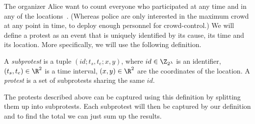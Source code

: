 
The organizer Alice want to count everyone who participated at any time and in 
any of the locations~\cite{2016DemonstrationsInSeoul}.
(Whereas police are only interested in the maximum crowd at any point in time, 
to deploy enough personnel for crowd-control.)
We will define a protest as an event that is uniquely identified by its cause, 
its time and its location.
More specifically, we will use the following definition.

\begin{definition}[Protest]\label{DefProtest}
  A \emph{subprotest} is a tuple \((id; t_s, t_e; x, y)\), where
  \(id\in \Z_{2^\lambda}\) is an identifier,
  \((t_s, t_e)\in \R^2\) is a time interval,
  \((x, y)\in \R^2\) are the coordinates of the location.
  A \emph{protest} is a set of subprotests sharing the same \(id\).
\end{definition}


The protests described above can be captured using this definition by splitting 
them up into subprotests.
Each subprotest will then be captured by our definition and to find the total 
we can just sum up the results.

